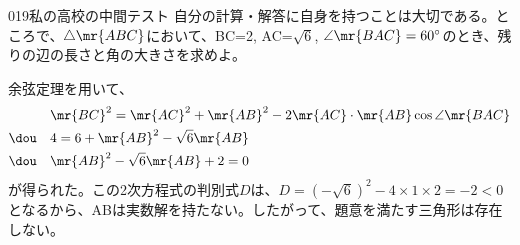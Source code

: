 \begin{prob}{019}{}{私の高校の中間テスト}
 自分の計算・解答に自身を持つことは大切である。ところで、$\triangle\mr{ABC}$において、BC=2, AC=$\sqrt{6}$, $\angle\mr{BAC}=60^\circ$のとき、残りの辺の長さと角の大きさを求めよ。
\end{prob}

余弦定理を用いて、
\begin{align*}
 &\mr{BC}^2=\mr{AC}^2+\mr{AB}^2-2\mr{AC}\cdot \mr{AB}\cos\angle\mr{BAC} \\
 \dou \quad &4=6+\mr{AB}^2-\sqrt{6}\mr{AB} \\
 \dou \quad &\mr{AB}^2-\sqrt{6}\mr{AB}+2=0
\end{align*}
が得られた。この2次方程式の判別式$D$は、$D=(-\sqrt{6})^2-4\times1\times2=-2<0$となるから、ABは実数解を持たない。したがって、題意を満たす三角形は存在しない。